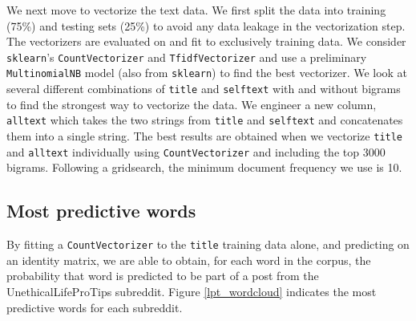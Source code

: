 \documentclass{amsart}
\theoremstyle{definition}
\theoremstyle{remark}
\begin{document}
We next move to vectorize the text data.  We first split the data into training (75\%) and testing sets (25\%) to avoid any data leakage in the vectorization step.  The vectorizers are evaluated on and fit to exclusively training data. We consider \texttt{sklearn}'s \texttt{CountVectorizer} and \texttt{TfidfVectorizer} and use a preliminary \texttt{MultinomialNB} model (also from \texttt{sklearn}) to find the best vectorizer.  We look at several different combinations of \texttt{title} and \texttt{selftext} with and without bigrams to find the strongest way to vectorize the data.  We engineer a new column, \texttt{alltext} which takes the two strings from \texttt{title} and \texttt{selftext} and concatenates them into a single string.  The best results are obtained when we vectorize \texttt{title} and \texttt{alltext} individually using \texttt{CountVectorizer} and including the top 3000 bigrams.  Following a gridsearch, the minimum document frequency we use is 10.

\subsection{Most predictive words}

By fitting a \texttt{CountVectorizer} to the \texttt{title} training data alone, and predicting on an identity matrix, we are able to obtain, for each word in the corpus, the probability that word is predicted to be part of a post from the UnethicalLifeProTips subreddit.  Figure \ref{lpt_wordcloud} indicates the most predictive words for each subreddit.
\end{document}

